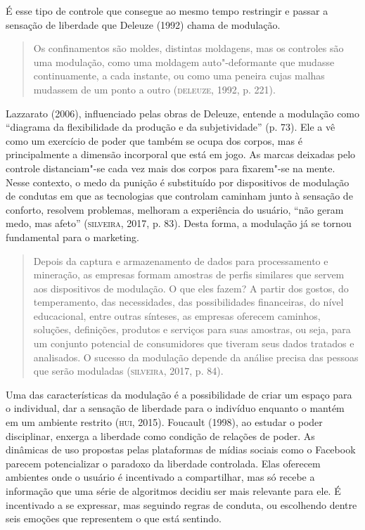 É esse tipo de controle que consegue ao mesmo tempo restringir e passar
a sensação de liberdade que Deleuze (1992) chama de modulação.

\begin{quote}
Os confinamentos são moldes, distintas moldagens, mas os controles são
uma modulação, como uma moldagem auto"-deformante que mudasse
continuamente, a cada instante, ou como uma peneira cujas malhas
mudassem de um ponto a outro (\textsc{deleuze}, 1992, p. 221).
\end{quote}

Lazzarato (2006), influenciado pelas obras de Deleuze, entende a
modulação como ``diagrama da flexibilidade da produção e da
subjetividade'' (p. 73). Ele a vê como um exercício de poder que também se
ocupa dos corpos, mas é principalmente a dimensão incorporal que está em
jogo. As marcas deixadas pelo controle distanciam"-se cada vez mais dos
corpos para fixarem"-se na mente. Nesse contexto, o medo da punição é
substituído por dispositivos de modulação de condutas em que as
tecnologias que controlam caminham junto à sensação de conforto,
resolvem problemas, melhoram a experiência do usuário, ``não geram medo,
mas afeto'' (\textsc{silveira}, 2017, p. 83). Desta forma, a modulação já se tornou
fundamental para o marketing.

\begin{quote}
Depois da captura e armazenamento de dados para processamento e
mineração, as empresas formam amostras de perfis similares que servem
aos dispositivos de modulação. O que eles fazem? A partir dos gostos, do
temperamento, das necessidades, das possibilidades financeiras, do nível
educacional, entre outras sínteses, as empresas oferecem caminhos,
soluções, definições, produtos e serviços para suas amostras, ou seja,
para um conjunto potencial de consumidores que tiveram seus dados
tratados e analisados. O sucesso da modulação depende da análise precisa
das pessoas que serão moduladas (\textsc{silveira}, 2017, p. 84).
\end{quote}

Uma das características da modulação é a possibilidade de criar um
espaço para o individual, dar a sensação de liberdade para o indivíduo
enquanto o mantém em um ambiente restrito (\textsc{hui}, 2015).
Foucault (1998), ao estudar o poder disciplinar, enxerga a liberdade como condição de
relações de poder. As dinâmicas de uso propostas pelas plataformas de
mídias sociais como o Facebook parecem potencializar o paradoxo da
liberdade controlada. Elas oferecem ambientes onde o usuário é
incentivado a compartilhar, mas só recebe a informação que uma série de
algoritmos decidiu ser mais relevante para ele. É incentivado a se
expressar, mas seguindo regras de conduta, ou escolhendo dentre seis
emoções que representem o que está sentindo.

